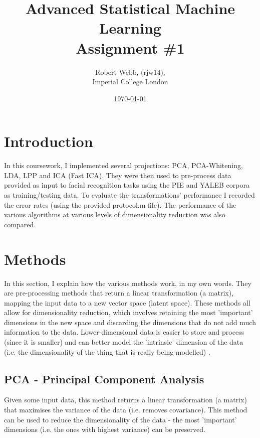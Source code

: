 \documentclass[12pt]{article} %
\title{Advanced Statistical Machine Learning \\ Assignment \#1}
\author{
	Robert Webb, (rjw14), \\
	Imperial College London
}
\date{\today}
\begin{document}

\maketitle

\section{Introduction} %

In this coursework, I implemented several projections: PCA, PCA-Whitening, LDA, LPP and ICA (Fast ICA). They were then used to pre-process data provided as input to facial recognition tasks using the PIE and YALEB corpora as training/testing data. To evaluate the transformations' performance I recorded the error rates (using the provided protocol.m file). The performance of the various algorithms at various levels of dimensionality reduction was also compared.



\section{Methods} %
In this section, I explain how the various methods work, in my own words. They are pre-processing methods that return a linear transformation (a matrix), mapping the input data to a new vector space (latent space). These methods all allow for dimensionality reduction, which involves retaining the most 'important' dimensions in the new space and discarding the dimensions that do not add much information to the data. Lower-dimensional data is easier to store and process (since it is smaller) and can better model the 'intrinsic' dimension of the data (i.e. the dimensionality of the thing that is really being modelled) \cite{dimensionality}.

\subsection{PCA - Principal Component Analysis}
Given some input data, this method returns a linear transformation (a matrix) that maximises the variance of the data (i.e. removes covariance). This method can be used to reduce the dimensionality of the data - the most 'important' dimensions (i.e. the ones with highest variance) can be preserved.
\end{document}
